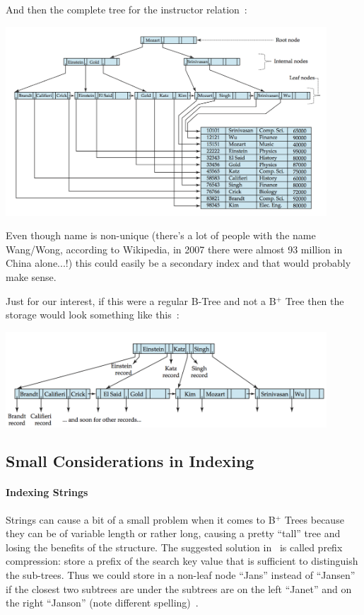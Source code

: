 And then the complete tree for the instructor relation~\cite{dsc}:

\begin{center}
	\includegraphics[width=0.9\textwidth]{images/b-tree-complete}
\end{center}

Even though name is non-unique (there's a lot of people with the name Wang/Wong, according to Wikipedia, in 2007 there were almost 93 million in China alone...!) this could easily be a secondary index and that would probably make sense.

Just for our interest, if this were a regular B-Tree and not a B$^{+}$ Tree then the storage would look something like this~\cite{dsc}:

\begin{center}
	\includegraphics[width=0.9\textwidth]{images/b-tree-equivalent}
\end{center}

\subsection*{Small Considerations in Indexing}

\paragraph{Indexing Strings}
Strings can cause a bit of a small problem when it comes to B$^{+}$ Trees because they can be of variable length or rather long, causing a pretty ``tall'' tree and losing the benefits of the structure. The suggested solution in~\cite{dsc} is called prefix compression: store a prefix of the search key value that is sufficient to distinguish the sub-trees. Thus we could store in a non-leaf node ``Jans'' instead of ``Jansen'' if the closest two subtrees are under the subtrees are on the left ``Janet'' and on the right ``Janson'' (note different spelling)~\cite{dsc}.

